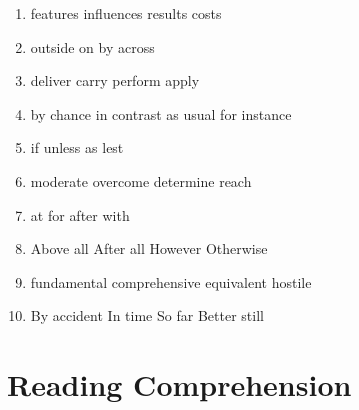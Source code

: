 \begin{enumerate}
\item


\fourchoices
{features}
{influences}
{results}
{costs}




\item


\fourchoices
{outside}
{on}
{by}
{across}




\item


\fourchoices
{deliver}
{carry}
{perform}
{apply}




\item


\fourchoices
{by chance}
{in contrast}
{as usual}
{for instance}





\item


\fourchoices
{if}
{unless}
{as}
{lest}




\item


\fourchoices
{moderate}
{overcome}
{determine}
{reach}




\item


\fourchoices
{at}
{for}
{after}
{with}




\item


\fourchoices
{Above all}
{After all}
{However}
{Otherwise}




\item

\fourchoices
{fundamental}
{comprehensive}
{equivalent}
{hostile}




\item


\fourchoices
{By accident}
{In time}
{So far}
{Better still}



\end{enumerate}


\vfil

\section{Reading Comprehension}



